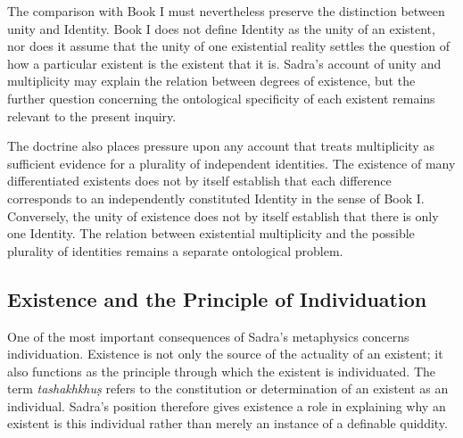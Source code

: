 \label{para:VS.B01.P01.C08.S17.SS07.P004}

The comparison with Book I
must nevertheless preserve
the distinction between unity
and Identity. Book I does
not define Identity as the
unity of an existent, nor
does it assume that the unity
of one existential reality
settles the question of how
a particular existent is
the existent that it is.
Sadra's account of unity
and multiplicity may explain
the relation between degrees
of existence, but the further
question concerning the
ontological specificity of
each existent remains relevant
to the present inquiry.

\label{para:VS.B01.P01.C08.S17.SS07.P005}

The doctrine also places pressure
upon any account that treats
multiplicity as sufficient
evidence for a plurality
of independent identities.
The existence of many
differentiated existents does
not by itself establish that
each difference corresponds
to an independently constituted
Identity in the sense of
Book I. Conversely, the unity
of existence does not by itself
establish that there is only
one Identity. The relation
between existential multiplicity
and the possible plurality
of identities remains a
separate ontological problem.




\subsection{Existence and the Principle of Individuation}
\label{subsec:ch08_s17_ss08}

\label{para:VS.B01.P01.C08.S17.SS08.P001}

One of the most important consequences
of Sadra's metaphysics concerns
individuation. Existence is not
only the source of the actuality
of an existent; it also functions
as the principle through which
the existent is individuated.
The term \textit{tashakhkhuṣ}
refers to the constitution
or determination of an existent
as an individual. Sadra's position
therefore gives existence a
role in explaining why an
existent is this individual
rather than merely an instance
of a definable quiddity.

